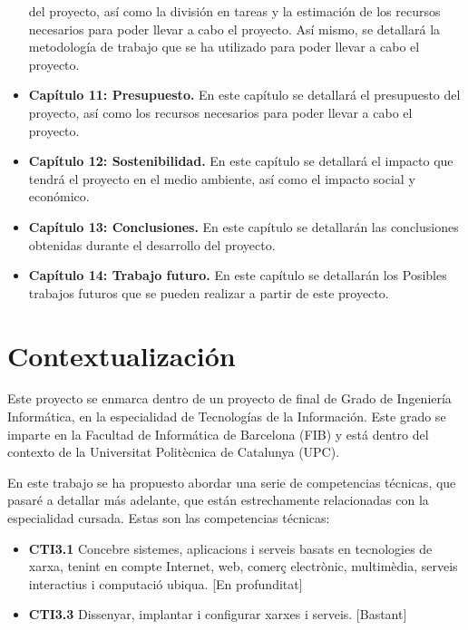 \begin{itemize}
        del proyecto, así como la división en tareas y la estimación de los recursos
        necesarios para poder llevar a cabo el proyecto. Así mismo, se detallará la
        metodología de trabajo que se ha utilizado para poder llevar a cabo el proyecto.
    \item \textbf{Capítulo 11: Presupuesto.} En este capítulo se detallará el presupuesto
        del proyecto, así como los recursos necesarios para poder llevar a cabo el proyecto.
    \item \textbf{Capítulo 12: Sostenibilidad.} En este capítulo se detallará el impacto
        que tendrá el proyecto en el medio ambiente, así como el impacto social y económico.
    \item \textbf{Capítulo 13: Conclusiones.} En este capítulo se detallarán las conclusiones
        obtenidas durante el desarrollo del proyecto.
    \item \textbf{Capítulo 14: Trabajo futuro.} En este capítulo se detallarán los Posibles
        trabajos futuros que se pueden realizar a partir de este proyecto.
\end{itemize}

\section{Contextualización}
\label{sec:contextualizacion}


Este proyecto se enmarca dentro de un proyecto de final de Grado de Ingeniería
Informática, en la especialidad de Tecnologías de la Información. Este grado se
imparte en la Facultad de Informática de Barcelona (FIB) y está dentro del contexto
de la Universitat Politècnica de Catalunya (UPC).

En este trabajo se ha propuesto abordar una serie de competencias técnicas, que
pasaré a detallar más adelante, que están estrechamente relacionadas con la
especialidad cursada. Estas son las competencias técnicas:

\begin{itemize}
    \item \textbf{CTI3.1} Concebre sistemes, aplicacions i serveis basats en
        tecnologies de xarxa, tenint en compte Internet, web, comerç electrònic,
        multimèdia, serveis interactius i computació ubiqua. [En profunditat] 
    \item \textbf{CTI3.3} Dissenyar, implantar i configurar xarxes i serveis. [Bastant]
\end{itemize}

